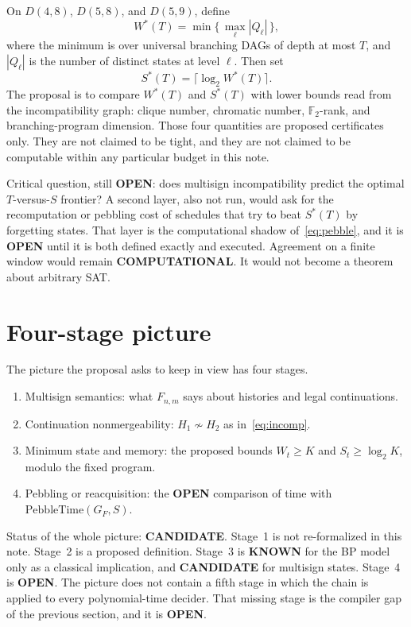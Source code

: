\documentclass[11pt]{article}
\begin{document}
On \(D(4,8)\), \(D(5,8)\), and \(D(5,9)\), define
\begin{equation}
W^{*}(T)
=
\min\bigl\{\, \max_{\ell} |Q_{\ell}| \,\bigr\},
\label{eq:wstar}
\end{equation}
where the minimum is over universal branching DAGs of depth at most \(T\), and \(|Q_{\ell}|\) is the number of distinct states at level \(\ell\).
Then set
\begin{equation}
S^{*}(T)=\lceil \log_2 W^{*}(T)\rceil.
\label{eq:sstar}
\end{equation}
The proposal is to compare \(W^{*}(T)\) and \(S^{*}(T)\) with lower bounds read from the incompatibility graph: clique number, chromatic number, \(\mathbb{F}_2\)-rank, and branching-program dimension.
Those four quantities are proposed certificates only.
They are not claimed to be tight, and they are not claimed to be computable within any particular budget in this note.

Critical question, still \textbf{OPEN}: does multisign incompatibility predict the optimal \(T\)-versus-\(S\) frontier?
A second layer, also not run, would ask for the recomputation or pebbling cost of schedules that try to beat \(S^{*}(T)\) by forgetting states.
That layer is the computational shadow of~\eqref{eq:pebble}, and it is \textbf{OPEN} until it is both defined exactly and executed.
Agreement on a finite window would remain \textbf{COMPUTATIONAL}.
It would not become a theorem about arbitrary SAT.

\section{Four-stage picture}
The picture the proposal asks to keep in view has four stages.
\begin{enumerate}
\item Multisign semantics: what \(F_{n,m}\) says about histories and legal continuations.
\item Continuation nonmergeability: \(H_1\not\sim H_2\) as in~\eqref{eq:incomp}.
\item Minimum state and memory: the proposed bounds \(W_t\ge K\) and \(S_t\ge\log_2 K\), modulo the fixed program.
\item Pebbling or reacquisition: the \textbf{OPEN} comparison of time with \(\mathrm{PebbleTime}(G_F,S)\).
\end{enumerate}
Status of the whole picture: \textbf{CANDIDATE}.
Stage~1 is not re-formalized in this note.
Stage~2 is a proposed definition.
Stage~3 is \textbf{KNOWN} for the BP model only as a classical implication, and \textbf{CANDIDATE} for multisign states.
Stage~4 is \textbf{OPEN}.
The picture does not contain a fifth stage in which the chain is applied to every polynomial-time decider.
That missing stage is the compiler gap of the previous section, and it is \textbf{OPEN}.
\end{document}
